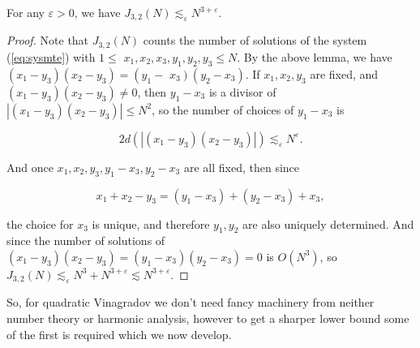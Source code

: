 \begin{cor}
 For any $\varepsilon>0$, we have $J_{3,2}(N) \lesssim _{\varepsilon} N^{3+\varepsilon}$.
\end{cor}
\begin{proof}
Note that $J_{3,2}(N)$ counts the number of solutions of the system (\ref{eq:sysmte}) with $1 \leq$ $x_{1}, x_{2}, x_{3}, y_{1}, y_{2}, y_{3} \leq N$. By the above lemma, we have $\left(x_{1}-y_{3}\right)\left(x_{2}-y_{3}\right)=\left(y_{1}-\right.$ $\left.x_{3}\right)\left(y_{2}-x_{3}\right)$. If $x_{1}, x_{2}, y_{3}$ are fixed, and $\left(x_{1}-y_{3}\right)\left(x_{2}-y_{3}\right) \neq 0$, then $y_{1}-x_{3}$ is a divisor of $\left|\left(x_{1}-y_{3}\right)\left(x_{2}-y_{3}\right)\right| \leq N^{2}$, so the number of choices of $y_{1}-x_{3}$ is

$$
2 d\left(\left|\left(x_{1}-y_{3}\right)\left(x_{2}-y_{3}\right)\right|\right) \lesssim _{\varepsilon} N^{\varepsilon}.
$$

And once $x_{1}, x_{2}, y_{3}, y_{1}-x_{3}, y_{2}-x_{3}$ are all fixed, then since

$$
x_{1}+x_{2}-y_{3}=\left(y_{1}-x_{3}\right)+\left(y_{2}-x_{3}\right)+x_{3},
$$

the choice for $x_{3}$ is unique, and therefore $y_{1}, y_{2}$ are also uniquely determined. And since the number of solutions of $\left(x_{1}-y_{3}\right)\left(x_{2}-y_{3}\right)=\left(y_{1}-x_{3}\right)\left(y_{2}-x_{3}\right)=0$ is $O(N^3)$, so $J_{3,2}(N)\lesssim_{\varepsilon}N^3 + N^{3+\varepsilon}\lesssim N^{3+\varepsilon}$.
\end{proof}
So, for quadratic Vinagradov we don't need fancy machinery from neither number theory or harmonic analysis, however to get a sharper lower bound some of the first is required which we now develop.

